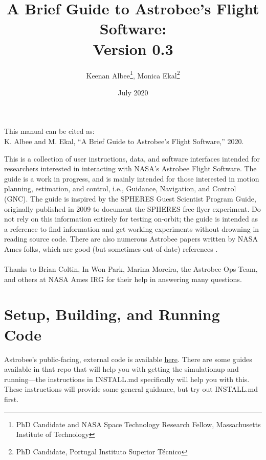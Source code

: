\documentclass{article}
\begin{document}
\vspace{2in}
\title{A Brief Guide to Astrobee's Flight Software:\\
        Version 0.3}
\author{Keenan Albee\footnote{PhD Candidate and NASA Space Technology Research Fellow, Massachusetts Institute of Technology}, Monica Ekal\footnote{PhD Candidate, Portugal Instituto Superior Técnico}}
\date{July 2020}
\maketitle
\vfill
\begin{center}
This manual can be cited as:\\
K. Albee and M. Ekal, “A Brief Guide to Astrobee’s Flight Software,” 2020.
\end{center}
\newpage
This is a collection of user instructions, data, and software interfaces intended for researchers interested in interacting with NASA's Astrobee Flight Software. The guide is a work in progress, and is mainly intended for those interested in motion planning, estimation, and control, i.e., Guidance, Navigation, and Control (GNC). The guide is inspired by the SPHERES Guest Scientist Program Guide, originally published in 2009 to document the SPHERES free-flyer experiment. Do not rely on this information entirely for testing on-orbit; the guide is intended as a reference to find information and get working experiments without drowning in reading source code. There are also numerous Astrobee papers written by NASA Ames folks, which are good (but sometimes out-of-date) references \cite{Park2017a} \cite{Smith2016} \cite{Watterson2016} \cite{Fluckiger} \cite{Coltin2016a} \cite{Kim2017} \cite{Bualat2015} \cite{Lee2018}.
\\
\\
\indent Thanks to Brian Coltin, In Won Park, Marina Moreira, the Astrobee Ops Team, and others at NASA Ames IRG for their help in answering many questions.
\newpage

\tableofcontents

\newpage

\section{Setup, Building, and Running Code} 

Astrobee's public-facing, external code is available \href{https://github.com/nasa/astrobee}{here}. There are some guides available in that repo that will help you with getting the simulationup and running---the instructions in INSTALL.md specifically will help you with this. These instructions will provide some general guidance, but try out INSTALL.md first.
\end{document}
